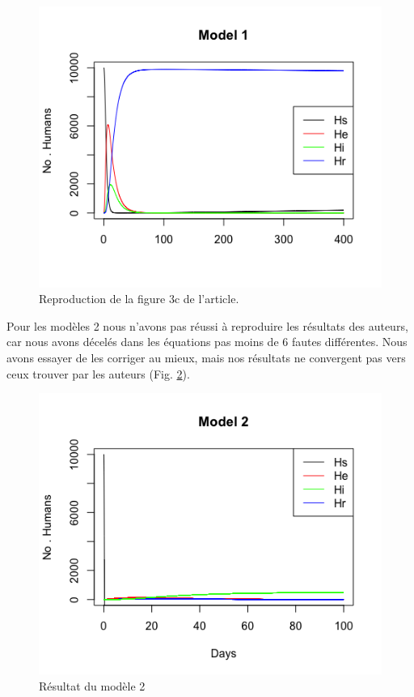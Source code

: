 \documentclass[
  12pt,
  french,
  oneside]{article}
\begin{document}
\begin{figure}
\hypertarget{fig:model1}{%
\centering
\includegraphics{figures/Model1.png}
\caption{Reproduction de la figure 3c de l'article.}\label{fig:model1}
}
\end{figure}

Pour les modèles 2 nous n'avons pas réussi à reproduire les résultats
des auteurs, car nous avons décelés dans les équations pas moins de 6
fautes différentes. Nous avons essayer de les corriger au mieux, mais
nos résultats ne convergent pas vers ceux trouver par les auteurs (Fig.
\ref{fig:model2}).

\begin{figure}
\hypertarget{fig:model2}{%
\centering
\includegraphics{figures/Model2.png}
\caption{Résultat du modèle 2}\label{fig:model2}
}
\end{figure}
\end{document}
